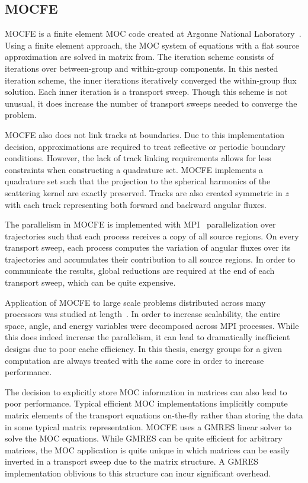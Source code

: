 \subsection{MOCFE}
\label{sec:mocfe}

MOCFE is a finite element \ac{MOC} code created at Argonne National Laboratory~\cite{mocfe_init}. Using a finite element approach, the \ac{MOC} system of equations with a flat source approximation are solved in matrix from. The iteration scheme consists of iterations over between-group and within-group components. In this nested iteration scheme, the inner iterations iteratively converged the within-group flux solution. Each inner iteration is a transport sweep. Though this scheme is not unusual, it does increase the number of transport sweeps needed to converge the problem.

MOCFE also does not link tracks at boundaries. Due to this implementation decision, approximations are required to treat reflective or periodic boundary conditions. However, the lack of track linking requirements allows for less constraints when constructing a quadrature set. MOCFE implements a quadrature set such that the projection to the spherical harmonics of the scattering kernel are exactly preserved. Tracks are also created symmetric in $z$ with each track representing both forward and backward angular fluxes.

The parallelism in MOCFE is implemented with \ac{MPI}~\cite{mpi} parallelization over trajectories such that each process receives a copy of all source regions. On every transport sweep, each process computes the variation of angular fluxes over its trajectories and accumulates their contribution to all source regions. In order to communicate the results, global reductions are required at the end of each transport sweep, which can be quite expensive.

Application of MOCFE to large scale problems distributed across many processors was studied at length~\cite{mocfe_bgp}. In order to increase scalability, the entire space, angle, and energy variables were decomposed across \ac{MPI} processes. While this does indeed increase the parallelism, it can lead to dramatically inefficient designs due to poor cache efficiency. In this thesis, energy groups for a given computation are always treated with the same core in order to increase performance.

The decision to explicitly store \ac{MOC} information in matrices can also lead to poor performance. Typical efficient \ac{MOC} implementations implicitly compute matrix elements of the transport equations on-the-fly rather than storing the data in some typical matrix representation.  MOCFE uses a \ac{GMRES} linear solver to solve the \ac{MOC} equations. While \ac{GMRES} can be quite efficient for arbitrary matrices, the  \ac{MOC} application is quite unique in which matrices can be easily inverted in a transport sweep due to the matrix structure. A \ac{GMRES} implementation oblivious to this structure can incur significant overhead.

